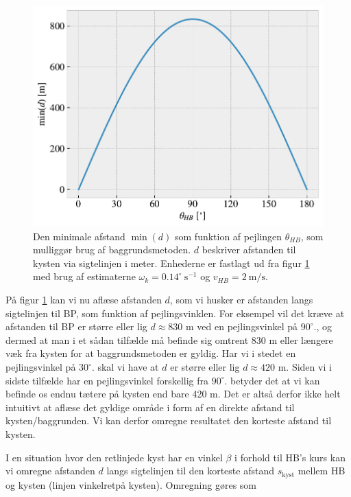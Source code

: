 \documentclass[%
 reprint,
nofootinbib,
aps,
]{revtex4-1}
\begin{document}
\begin{figure}[H]
  \includegraphics[width=\linewidth]{figures/limit_dimension.pdf}
  \caption{Den minimale afstand $\min{(d)}$ som funktion af pejlingen $\theta_{HB}$, som mulliggør brug af baggrundsmetoden. $d$ beskriver afstanden til kysten via sigtelinjen i meter. Enhederne er fastlagt ud fra figur \ref{fig:limit_dimension} med brug af estimaterne $\omega_k = 0.14^{\circ}\ \text{s}^{-1}$ og $v_{HB} = 2 \ \text{m/s}$.}
  \label{fig:limit_dimension}
\end{figure}
På figur \ref{fig:limit_dimension} kan vi nu aflæse afstanden $d$, som vi husker er afstanden langs sigtelinjen til BP, som funktion af pejlingsvinklen. For eksempel vil det kræve at afstanden til BP er større eller lig $d\approx 830$ m ved en pejlingsvinkel på $90 ^{\circ}.$, og dermed at man i et sådan tilfælde må befinde sig omtrent $830$ m eller længere væk fra kysten for at baggrundsmetoden er gyldig. Har vi i stedet en pejlingsvinkel på $30 ^{\circ}.$ skal vi have at $d$ er større eller lig  $d\approx 420$ m. Siden vi i sidste tilfælde har en pejlingsvinkel forskellig fra $90 ^{\circ}.$ betyder det at vi kan befinde os endnu tætere på kysten end bare 420 m. Det er altså derfor ikke helt intuitivt at aflæse det gyldige område i form af en direkte afstand til kysten/baggrunden. Vi kan derfor omregne resultatet den korteste afstand til kysten. \par
I en situation hvor den retlinjede kyst har en vinkel $\beta$ i forhold til HB's kurs kan vi omregne afstanden $d$ langs sigtelinjen til den korteste afstand $s_{\text{kyst}}$ mellem HB og kysten (linjen vinkelretpå kysten). Omregning gøres som
\end{document}
